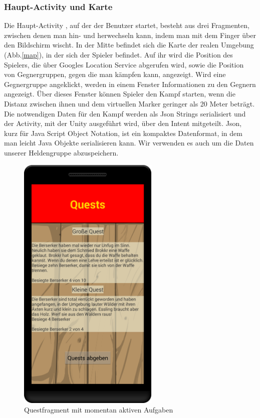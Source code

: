 \documentclass[extern,palatino]{cgBA}
\begin{document}
\subsubsection{Haupt-Activity und Karte}Die Haupt-Activity , auf der der Benutzer startet, besteht aus drei Fragmenten, zwischen denen man hin- und herwechseln kann, indem man mit dem Finger über den Bildschirm wischt. In der Mitte befindet sich die Karte der realen Umgebung (Abb.\ref{map}), in der sich der Spieler befindet. Auf ihr wird die Position des Spielers, die über Googles Location Service abgerufen wird, sowie die Position von Gegnergruppen, gegen die man kämpfen kann, angezeigt. Wird eine Gegnergruppe angeklickt, werden in einem Fenster Informationen zu den Gegnern angezeigt. Über dieses Fenster können Spieler den Kampf starten, wenn die Distanz zwischen ihnen und dem virtuellen Marker geringer als 20 Meter beträgt. Die notwendigen Daten für den Kampf werden als Json Strings serialisiert und der Activity, mit der Unity ausgeführt wird, über den Intent mitgeteilt. Json, kurz für Java Script Object Notation, ist ein kompaktes Datenformat, in dem man leicht Java Objekte serialisieren kann. Wir verwenden es auch um die Daten unserer Heldengruppe abzuspeichern.	
\newpage
\begin{figure}[H] 
		\centering
		\includegraphics[width=0.6\textwidth]{questfragment.png}
		\caption{Questfragment mit momentan aktiven Aufgaben}
		\label{questfragment}
\end{figure}
\end{document}
